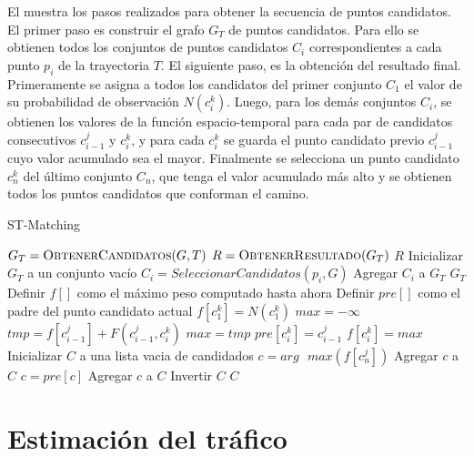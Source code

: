 El  muestra los pasos realizados para obtener la secuencia de puntos candidatos. El primer paso es construir el grafo $G_T$ de puntos candidatos. Para ello se obtienen todos los conjuntos de puntos candidatos $C_i$ correspondientes a cada punto $p_i$ de la trayectoria $T$. El siguiente paso, es la obtención del resultado final. Primeramente se asigna a todos los candidatos del primer conjunto $C_1$ el valor de su probabilidad de observación $N(c_i^k)$. Luego, para los demás conjuntos $C_i$, se obtienen los valores de la función espacio-temporal para cada par de candidatos consecutivos $c_{i-1}^j$ y $c_i^k$, y para cada $c_i^k$ se guarda el punto candidato previo $c_{i-1}^j$ cuyo valor acumulado sea el mayor. Finalmente se selecciona un punto candidato $c_n^k$ del último conjunto $C_n$, que tenga el valor acumulado más alto y se obtienen todos los puntos candidatos que conforman el camino.

\begin{algorithm}
\caption{ST-Matching}
\label{alg:st_matching}
\begin{algorithmic}[1]
	\State $G_T = \Call{ObtenerCandidatos}{G,T}$
	\State $R = \Call{ObtenerResultado}{G_T}$
	\State \Return $R$
\EndProcedure
\Statex
{}
	\State Inicializar $G_T$ a un conjunto vacío
		\State $C_i = SeleccionarCandidatos(p_i, G)$
		\State Agregar $C_i$ a $G_T$
	\EndFor
	\State \Return $G_T$
\EndFunction
\Statex
{}
	\State Definir $f[]$ como el máximo peso computado hasta ahora
	\State Definir $pre[]$ como el padre del punto candidato actual
		\State $f[c_1^k] = N(c_1^k)$
	\EndFor
			\State $max = -\infty$
				\State $tmp = f[c_{i-1}^j] + F(c_{i-1}^j,c_i^k)$
					\State $max = tmp$
					\State $pre[c_i^k] = c_{i-1}^j$
				\EndIf
				\State $f[c_i^k] = max$
			\EndFor
		\EndFor
	\EndFor
	\State Inicializar $C$ a una lista vacia de candidados
	\State $c = arg \text{ } max(f[c_n^j])$
		\State Agregar $c$ a $C$
		\State $c = pre[c]$
	\EndFor
	\State Agregar $c$ a $C$
	\State Invertir $C$
	\State \Return $C$
\EndFunction
\end{algorithmic}
\end{algorithm}

\section{Estimación del tráfico}
\label{estimacion_trafico}

